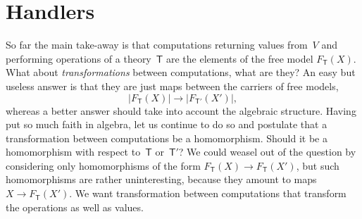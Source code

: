 \documentclass{amsart}
\newcommand{\theory}[1]{\mathsf{#1}} %
\newcommand{\carrier}[1]{|#1|} %
\newcommand{\Free}[2]{F_{\theory{#1}}(#2)} %
\begin{document}
\section{Handlers}
\label{sec:handlers}

So far the main take-away is that computations returning values from~$V$ and
performing operations of a theory~$\theory{T}$ are the elements of the free
model $\Free{T}{X}$. What about \emph{transformations} between computations,
what are they? An easy but useless answer is that they are just maps between the
carriers of free models,
%
\begin{equation*}
  \carrier{\Free{T}{X}} \longrightarrow \carrier{\Free{T'}{X'}},
\end{equation*}
%
whereas a better answer should take into account the algebraic structure. Having
put so much faith in algebra, let us continue to do so and postulate that a
transformation between computations be a homomorphism. Should it be a
homomorphism with respect to~$\theory{T}$ or~$\theory{T}'$? We could weasel out
of the question by considering only homomorphisms of the form
$\Free{T}{X} \to \Free{T}{X'}$, but such homomorphisms are rather uninteresting,
because they amount to maps~$X \to \Free{T}{X'}$. We want
transformation between computations that transform the operations as well as
values.
\end{document}
